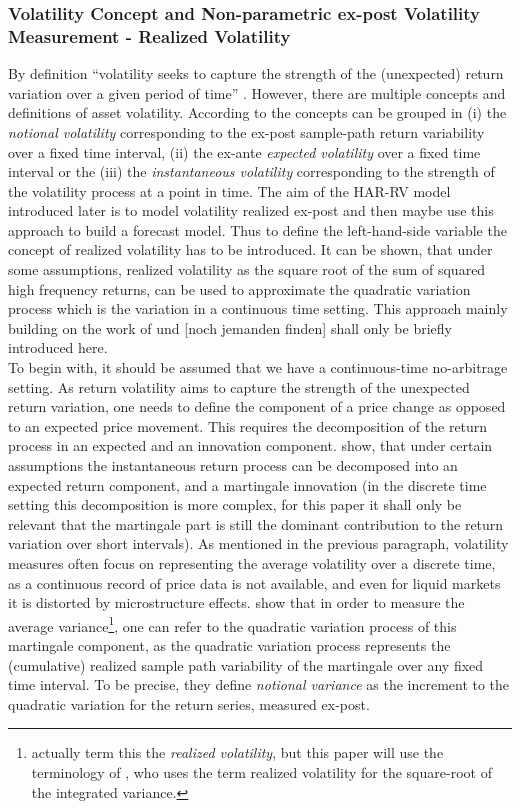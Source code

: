 \subsubsection{Volatility Concept and Non-parametric ex-post Volatility Measurement - Realized Volatility}
By definition ``volatility seeks to capture the strength of the (unexpected) return variation over a given period of time'' \parencite[p.7]{andersen2001}. However, there are multiple concepts and definitions of asset volatility. According to \citeauthor{andersen2001} the concepts can be grouped in (i) the \emph{notional volatility} corresponding to the ex-post sample-path return variability over a fixed time interval, (ii) the ex-ante \emph{expected volatility} over a fixed time interval or the (iii) the \emph{instantaneous volatility} corresponding to the strength of the volatility process at a point in time.
The aim of the HAR-RV model introduced later is to model volatility realized ex-post and then maybe use this approach to build a forecast model. Thus to define the left-hand-side variable the concept of realized volatility has to be introduced.
It can be shown, that under some assumptions, realized volatility as the square root of the sum of squared high frequency returns, can be used to approximate the quadratic variation process which is the variation in a continuous time setting. This approach mainly building on the work of \citeauthor{andersen2001} und [noch jemanden finden] shall only be briefly introduced here. \\
To begin with, it should be assumed that we have a continuous-time no-arbitrage setting. As return volatility aims to capture the strength of the unexpected return variation, one needs to define the component of a price change as opposed to an expected price movement. This requires the decomposition of the return process in an expected and an innovation component. \citeauthor{andersen2001} show, that under certain assumptions the instantaneous return process can be decomposed into an expected return component, and a martingale innovation (in the discrete time setting this decomposition is more complex, for this paper it shall only be relevant that the martingale part is still the dominant contribution to the return variation over short intervals). As mentioned in the previous paragraph, volatility measures often focus on representing the average volatility over a discrete time, as a continuous record of price data is not available, and even for liquid markets it is distorted by microstructure effects. \textcite{andersen2001} show that in order to measure the average variance\footnote{actually \textcite{andersen2001} term this the \emph{realized volatility}, but this paper will use the terminology of \textcite{corsi2009}, who uses the term realized volatility for the square-root of the integrated variance.}, one can refer to the quadratic variation process of this martingale component, as the quadratic variation process represents the (cumulative) realized sample path variability of the martingale over any fixed time interval. To be precise, they define \emph{notional variance} as the increment to the quadratic variation for the return series, measured ex-post. \\
